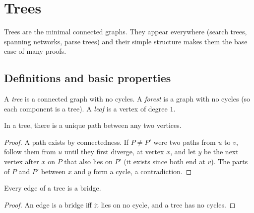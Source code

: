\chapter{Trees}


Trees are the minimal connected graphs. They appear everywhere (search trees, spanning
networks, parse trees) and their simple structure makes them the base case of many proofs.

\section{Definitions and basic properties}

\begin{definition}
A \emph{tree} is a connected graph with no cycles. A \emph{forest} is a graph with no cycles
(so each component is a tree). A \emph{leaf} is a vertex of degree $1$.
\end{definition}

\begin{center}
\end{center}

\begin{lemma}
In a tree, there is a unique path between any two vertices.
\end{lemma}
\begin{proof}
A path exists by connectedness. If $P \ne P'$ were two paths from $u$ to $v$, follow them from
$u$ until they first diverge, at vertex $x$, and let $y$ be the next vertex after $x$ on $P$
that also lies on $P'$ (it exists since both end at $v$). The parts of $P$ and $P'$ between $x$
and $y$ form a cycle, a contradiction.
\end{proof}

\begin{lemma}
Every edge of a tree is a bridge.
\end{lemma}
\begin{proof}
An edge is a bridge iff it lies on no cycle, and a tree has no cycles.
\end{proof}

